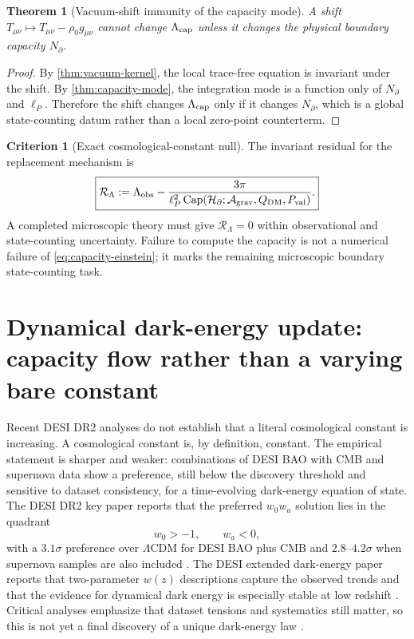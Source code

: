 \documentclass[aps,prd,reprint,nofootinbib,superscriptaddress]{revtex4-2}
\numberwithin{equation}{section}
\theoremstyle{definition}
\newtheorem{criterion}{Criterion}[section]
\theoremstyle{plain}
\newtheorem{theorem}{Theorem}[section]
\newcommand{\Agrav}{\mathcal A_{\rm grav}}
\newcommand{\Ncap}{N_{\partial}}
\newcommand{\Capacity}{\operatorname{Cap}}
\begin{document}
\begin{theorem}[Vacuum-shift immunity of the capacity mode]\label{thm:vacuum-shift-immunity}
A shift \(T_{\mu\nu}\mapsto T_{\mu\nu}-\rho_0g_{\mu\nu}\) cannot change \(\Lambda_{\rm cap}\) unless it changes the physical boundary capacity \(\Ncap\).
\end{theorem}

\begin{proof}
By \cref{thm:vacuum-kernel}, the local trace-free equation is invariant under the shift.  By \cref{thm:capacity-mode}, the integration mode is a function only of \(\Ncap\) and \(\ell_P\).  Therefore the shift changes \(\Lambda_{\rm cap}\) only if it changes \(\Ncap\), which is a global state-counting datum rather than a local zero-point counterterm.
\end{proof}

\begin{criterion}[Exact cosmological-constant null]\label{crit:lambda-null}
The invariant residual for the replacement mechanism is
\begin{equation}
\boxed{
\mathcal R_\Lambda
:=
\Lambda_{\rm obs}
-
\frac{3\pi}
{\ell_P^2\Capacity(\mathcal H_\partial;\Agrav,Q_{\rm DM},P_{\rm val})}.
}
\end{equation}
A completed microscopic theory must give \(\mathcal R_\Lambda=0\) within observational and state-counting uncertainty.  Failure to compute the capacity is not a numerical failure of \eqref{eq:capacity-einstein}; it marks the remaining microscopic boundary state-counting task.
\end{criterion}


\section{Dynamical dark-energy update: capacity flow rather than a varying bare constant}\label{sec:dynamic-capacity}

Recent DESI DR2 analyses do not establish that a literal cosmological constant is increasing.  A cosmological constant is, by definition, constant.  The empirical statement is sharper and weaker: combinations of DESI BAO with CMB and supernova data show a preference, still below the discovery threshold and sensitive to dataset consistency, for a time-evolving dark-energy equation of state.  The DESI DR2 key paper reports that the preferred \(w_0w_a\) solution lies in the quadrant
\[
w_0>-1,\qquad w_a<0,
\]
with a \(3.1\sigma\) preference over \(\Lambda\)CDM for DESI BAO plus CMB and \(2.8\)--\(4.2\sigma\) when supernova samples are also included \cite{DESIDR2BAO2025}.  The DESI extended dark-energy paper reports that two-parameter \(w(z)\) descriptions capture the observed trends and that the evidence for dynamical dark energy is especially stable at low redshift \cite{DESIDR2Extended2025}.  Critical analyses emphasize that dataset tensions and systematics still matter, so this is not yet a final discovery of a unique dark-energy law \cite{WangMota2025}.
\end{document}
